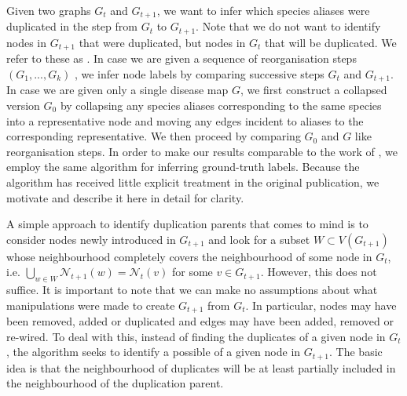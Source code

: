 \documentclass[
	fontsize=10pt, %
	twoside=false, %
	secnumdepth=1, %
  toc=indentunnumbered %
]{kaobook}
\begin{document}
Given two graphs $G_t$ and $G_{t+1}$, we want to infer which species aliases
were duplicated in the step from $G_t$ to $G_{t+1}$. Note that we do not want to
identify nodes in $G_{t+1}$ that were duplicated, but nodes in $G_t$ that will
be duplicated. We refer to these as .
In case we are given a sequence of reorganisation steps $(G_1, ...,
G_k)$ , we infer node labels by comparing successive steps $G_t$ and $G_{t+1}$.
In
case we are given only a single disease map $G$, we first construct a collapsed
version $G_0$ by collapsing any species aliases
corresponding to the same species into a representative node and moving any edges
incident to aliases to the corresponding representative. We then proceed by
comparing $G_0$ and $G$ like reorganisation steps.
%
In order to make our results comparable to the work of
\citeauthor{nielsen_MachineLearningSupport_2019}
\cite{nielsen_MachineLearningSupport_2019}, we employ the same algorithm for
inferring ground-truth labels. Because the algorithm has received little
explicit treatment in the original publication, we motivate and describe it here
in detail for clarity.
%

A simple approach to identify duplication parents that comes to mind is to
consider nodes newly introduced in $G_{t+1}$ and look for a subset $W \subset
V(G_{t+1})$ whose neighbourhood completely covers the neighbourhood of some node
in $G_{t}$, i.e. $\bigcup_{w \in W} \mathcal{N}_{t+1}(w) = \mathcal{N}_t(v)$ for
some $v \in G_{t+1}$. However, this does not suffice. It is important to note
that we can make no assumptions about what manipulations were made to create
$G_{t+1}$ from $G_t$. In particular, nodes may have been removed, added or
duplicated and edges may have been added, removed or re-wired.
%
To deal with this, instead of finding the duplicates of a given node in
$G_{t}$, the algorithm seeks to identify a possible  of
a given node in $G_{t+1}$. The basic idea is that the neighbourhood of
duplicates will be at least partially included in the neighbourhood of the
duplication parent.
\end{document}
